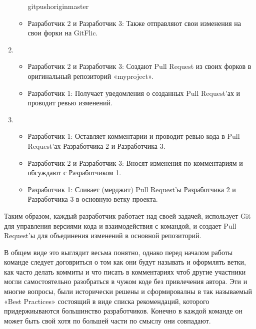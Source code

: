\documentclass[letterpaper,10pt,russian]{sphinxmanual}
\begin{document}
\begin{enumerate}
\begin{itemize}
\begin{sphinxVerbatim}[commandchars=\\\{\}]
gitpushoriginmaster
\end{sphinxVerbatim}

\item {} 
\sphinxAtStartPar
Разработчик 2 и Разработчик 3: Также отправляют свои изменения на свои форки на GitFlic.

\end{itemize}

\item {} 
\sphinxAtStartPar
{}
\begin{itemize}
\item {} 
\sphinxAtStartPar
Разработчик 2 и Разработчик 3: Создают Pull Request из своих форков в оригинальный репозиторий «myproject».

\item {} 
\sphinxAtStartPar
Разработчик 1: Получает уведомления о созданных Pull Request’ах и проводит ревью изменений.

\end{itemize}

\item {} 
\sphinxAtStartPar
{}
\begin{itemize}
\item {} 
\sphinxAtStartPar
Разработчик 1: Оставляет комментарии и проводит ревью кода в Pull Request’ах Разработчика 2 и Разработчика 3.

\item {} 
\sphinxAtStartPar
Разработчик 2 и Разработчик 3: Вносят изменения по комментариям и обсуждают с Разработчиком 1.

\item {} 
\sphinxAtStartPar
Разработчик 1: Сливает (мерджит) Pull Request’ы Разработчика 2 и Разработчика 3 в основную ветку проекта.

\end{itemize}

\end{enumerate}

\sphinxAtStartPar
Таким образом, каждый разработчик работает над своей задачей, использует Git для управления версиями кода и взаимодействия с командой, и создает Pull Request’ы для объединения изменений в основной репозиторий.

\sphinxAtStartPar
В общем виде это выглядит весьма понятно, однако перед началом работы команде следует договриться о том как они будут называть и оформлять ветки, как часто делать коммиты и что писать в комментариях чтоб другие участники могли самостоятельно разобраться в чужом коде без привлечения автора. Эти и многие вопросы, были исторически решены и сформировалны в так называемый «Best Practices» состоящий в виде списка рекомендаций, которого придержиываются большинство разработчиков. Конечно в каждой команде он может быть свой хотя по большей части по смыслу они совпадают.
\end{document}
